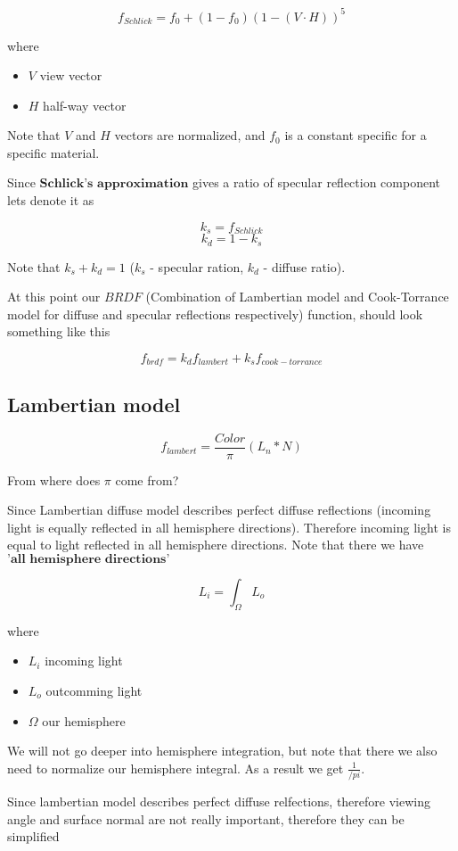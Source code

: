 \documentclass{article}
\begin{document}
\[
    f_{Schlick} = f_{0} + (1 - f_{0})(1 - (V \cdot H))^5
\]

where
\begin{itemize}
    \item $V$ view vector
    \item $H$ half-way vector
\end{itemize}

Note that $V$ and $H$ vectors are normalized, and $f_{0}$ is a constant specific for a specific material.

Since $\textbf{Schlick's approximation}$ gives a ratio of specular reflection component lets denote it as

\[
    k_s = f_{Schlick}
\]
\[
    k_d = 1 - k_s
\]

Note that $k_s + k_d = 1$ ($k_s$ - specular ration, $k_d$ - diffuse ratio).

At this point our $BRDF$ (Combination of Lambertian model and Cook-Torrance model for diffuse and specular reflections respectively) function, 
should look something like this

\[
    f_{brdf} = k_d f_{lambert} + k_s f_{cook-torrance}
\]

\subsection{Lambertian model}

\[
    f_{lambert} = \frac{Color}{\pi}(L_{n} * N)
\]

From where does $\pi$ come from?

Since Lambertian diffuse model describes perfect diffuse reflections
(incoming light is equally reflected in all hemisphere directions).
Therefore incoming light is equal to light reflected in all hemisphere directions.
Note that there we have $\textbf{'all hemisphere directions'}$

\[
    L_i = \int _{\Omega } L_o
\]

where
\begin{itemize}
    \item $L_i$ incoming light
    \item $L_o$ outcomming light
    \item $\Omega$ our hemisphere
\end{itemize}

We will not go deeper into hemisphere integration, but note that
there we also need to normalize our hemisphere integral. As a result we get $\frac{1}{/pi}$.

Since lambertian model describes perfect diffuse relfections,
therefore viewing angle and surface normal are not
really important, therefore they can be simplified 
\end{document}
